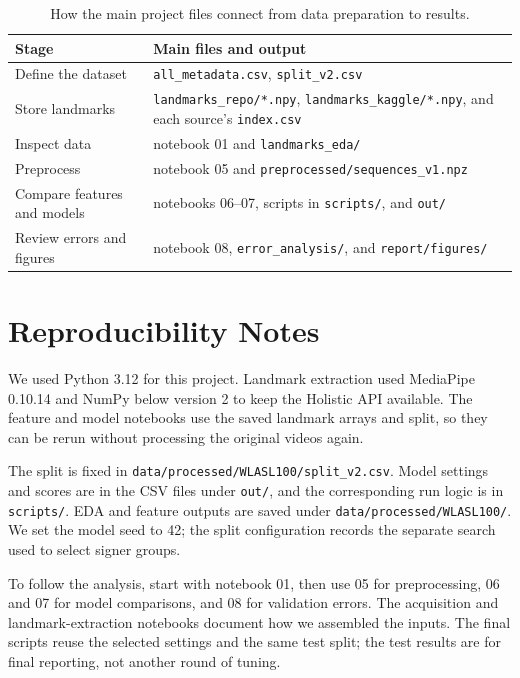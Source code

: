 \documentclass[12pt,a4paper,oneside]{report}
\begin{document}
\begin{table}[H]
\centering
\label{tab:file-flow}
\begin{tabularx}{\textwidth}{lX}
\toprule
Stage & Main files and output \\
\midrule
Define the dataset & \texttt{all\_metadata.csv}, \texttt{split\_v2.csv} \\
Store landmarks & \texttt{landmarks\_repo/*.npy}, \texttt{landmarks\_kaggle/*.npy}, and each source's \texttt{index.csv} \\
Inspect data & notebook 01 and \texttt{landmarks\_eda/} \\
Preprocess & notebook 05 and \texttt{preprocessed/sequences\_v1.npz} \\
Compare features and models & notebooks 06--07, scripts in \texttt{scripts/}, and \texttt{out/} \\
Review errors and figures & notebook 08, \texttt{error\_analysis/}, and \texttt{report/figures/} \\
\bottomrule
\end{tabularx}
\caption{How the main project files connect from data preparation to results.}
\end{table}

\appendix
\chapter{Reproducibility Notes}
We used Python 3.12 for this project. Landmark extraction used MediaPipe 0.10.14 and NumPy below version 2 to keep the Holistic API available. The feature and model notebooks use the saved landmark arrays and split, so they can be rerun without processing the original videos again.

The split is fixed in \texttt{data/processed/WLASL100/split\_v2.csv}. Model settings and scores are in the CSV files under \texttt{out/}, and the corresponding run logic is in \texttt{scripts/}. EDA and feature outputs are saved under \texttt{data/processed/WLASL100/}. We set the model seed to 42; the split configuration records the separate search used to select signer groups.

To follow the analysis, start with notebook 01, then use 05 for preprocessing, 06 and 07 for model comparisons, and 08 for validation errors. The acquisition and landmark-extraction notebooks document how we assembled the inputs. The final scripts reuse the selected settings and the same test split; the test results are for final reporting, not another round of tuning.
\end{document}
